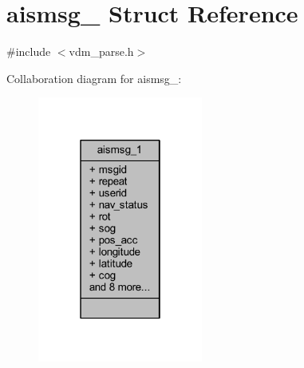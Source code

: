 \hypertarget{structaismsg__1}{}\section{aismsg\+\_ Struct Reference}
\label{structaismsg__1}


{\ttfamily \#include $<$vdm\+\_\+parse.\+h$>$}



Collaboration diagram for aismsg\+\_\+:
\nopagebreak
\begin{figure}[H]
\begin{center}
\leavevmode
\includegraphics[width=154pt]{structaismsg__1__coll__graph}
\end{center}
\end{figure}

